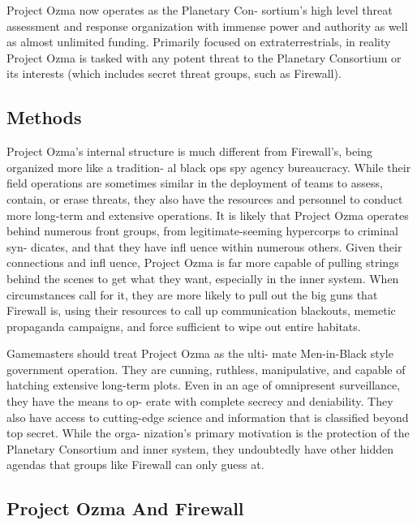 Project Ozma now operates as the Planetary Con-
sortium's high level threat assessment and response 
organization with immense power and authority as 
well as almost unlimited funding. Primarily focused 
on extraterrestrials, in reality Project Ozma is tasked 
with any potent threat to the Planetary Consortium 
or its interests (which includes secret threat groups, 
such as Firewall). 

\subsection{Methods }

Project Ozma's internal structure is much different 
from Firewall's, being organized more like a tradition-
al black ops spy agency bureaucracy. While their field 
operations are sometimes similar in the deployment 
of teams to assess, contain, or erase threats, they also 
have the resources and personnel to conduct more 
long-term and extensive operations. It is likely that 
Project Ozma operates behind numerous front groups, 
from legitimate-seeming hypercorps to criminal syn-
dicates, and that they have infl uence within numerous 
others. Given their connections and infl uence, Project 
Ozma is far more capable of pulling strings behind the 
scenes to get what they want, especially in the inner 
system. When circumstances call for it, they are more 
likely to pull out the big guns that Firewall is, using 
their resources to call up communication blackouts, 
memetic propaganda campaigns, and force sufficient 
to wipe out entire habitats.

Gamemasters should treat Project Ozma as the ulti-
mate Men-in-Black style government operation. They 
are cunning, ruthless, manipulative, and capable of 
hatching extensive long-term plots. Even in an age of 
omnipresent surveillance, they have the means to op-
erate with complete secrecy and deniability. They also 
have access to cutting-edge science and information 
that is classified beyond top secret. While the orga-
nization's primary motivation is the protection of 
the Planetary Consortium and inner system, they 
undoubtedly have other hidden agendas that groups 
like Firewall can only guess at. 

\subsection{Project Ozma And Firewall }

